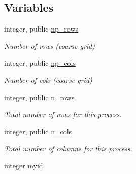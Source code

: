 \subsection*{Variables}
\begin{DoxyCompactItemize}
\item 
\hypertarget{namespacempi__tools_a2cd56c685e206873eb442373ecc65ce3}{}integer, public \hyperlink{namespacempi__tools_a2cd56c685e206873eb442373ecc65ce3}{np\+\_\+rows}\label{namespacempi__tools_a2cd56c685e206873eb442373ecc65ce3}

\begin{DoxyCompactList}\small\item\em Number of rows (coarse grid) \end{DoxyCompactList}\item 
\hypertarget{namespacempi__tools_a27b553237754653c1ccc5b214c851c5b}{}integer, public \hyperlink{namespacempi__tools_a27b553237754653c1ccc5b214c851c5b}{np\+\_\+cols}\label{namespacempi__tools_a27b553237754653c1ccc5b214c851c5b}

\begin{DoxyCompactList}\small\item\em Number of cols (coarse grid) \end{DoxyCompactList}\item 
\hypertarget{namespacempi__tools_a2f5b133c9f71ef0be89ad7e98527b16a}{}integer, public \hyperlink{namespacempi__tools_a2f5b133c9f71ef0be89ad7e98527b16a}{n\+\_\+rows}\label{namespacempi__tools_a2f5b133c9f71ef0be89ad7e98527b16a}

\begin{DoxyCompactList}\small\item\em Total number of rows for this process. \end{DoxyCompactList}\item 
\hypertarget{namespacempi__tools_a7268786bfda0663898367d2a2bce4d43}{}integer, public \hyperlink{namespacempi__tools_a7268786bfda0663898367d2a2bce4d43}{n\+\_\+cols}\label{namespacempi__tools_a7268786bfda0663898367d2a2bce4d43}

\begin{DoxyCompactList}\small\item\em Total number of columns for this process. \end{DoxyCompactList}\item 
\hypertarget{namespacempi__tools_ad3cb5feb291992c32fc58d49f150d5bf}{}integer \hyperlink{namespacempi__tools_ad3cb5feb291992c32fc58d49f150d5bf}{myid}\label{namespacempi__tools_ad3cb5feb291992c32fc58d49f150d5bf}


\end{DoxyCompactItemize}
